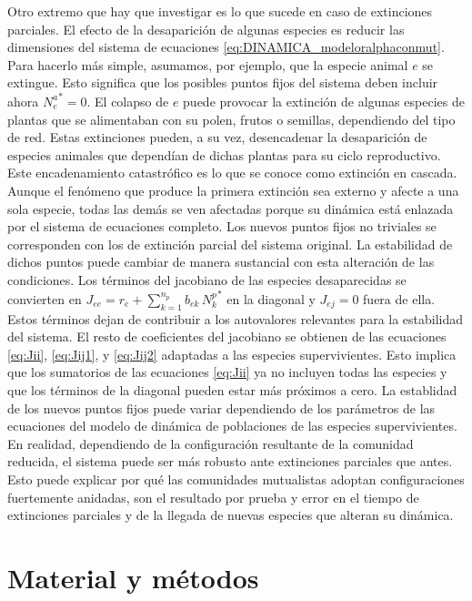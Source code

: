Otro extremo que hay que investigar es lo que sucede en caso de extinciones parciales. El efecto de la desaparición de algunas especies es reducir las dimensiones del sistema de ecuaciones \ref{eq:DINAMICA_modeloralphaconmut}. Para hacerlo más simple, asumamos, por ejemplo, que la especie animal $e$ se extingue. Esto significa que los posibles puntos fijos del sistema deben incluir ahora ${N_e^a}^* = 0$. El colapso de $e$ puede provocar la extinción de algunas especies de plantas que se alimentaban con su polen, frutos o semillas, dependiendo del tipo de red. Estas extinciones pueden, a su vez, desencadenar la desaparición de especies animales que dependían de dichas plantas para su ciclo reproductivo. Este encadenamiento catastrófico es lo que se conoce como extinción en cascada. Aunque el fenómeno que produce la primera extinción sea externo y afecte a una sola especie, todas las demás se ven afectadas porque su dinámica está enlazada por el sistema de ecuaciones completo. Los nuevos puntos fijos no triviales se corresponden con los de extinción parcial del sistema original. La estabilidad de dichos puntos puede cambiar de manera sustancial con esta alteración de las condiciones. Los términos del jacobiano de las especies desaparecidas se convierten en $J_{ee} = r_e + \sum_{k =1}^{n_p }b_{ek}\,{N_k^p}^*$ en la diagonal y $J_{ej} = 0$ fuera de ella. Estos términos dejan de contribuir a los autovalores relevantes para la estabilidad del sistema. El resto de coeficientes del jacobiano se obtienen de las ecuaciones \ref{eq:Jii}, \ref{eq:Jij1}, y \ref{eq:Jij2} adaptadas a las especies supervivientes. Esto implica que los sumatorios de las ecuaciones \ref{eq:Jii} ya no incluyen todas las especies y que los términos de la diagonal pueden estar más próximos a cero. La establidad de los nuevos puntos fijos puede variar dependiendo de los parámetros de las ecuaciones del modelo de dinámica de poblaciones de las especies supervivientes. En realidad, dependiendo de la configuración resultante de la comunidad reducida, el sistema puede ser más robusto ante extinciones parciales que antes. Esto puede explicar por qué las comunidades mutualistas adoptan configuraciones fuertemente anidadas, son el resultado por prueba y error en el tiempo de extinciones parciales y de la llegada de nuevas especies que alteran su dinámica.   

\section{Material y métodos}

